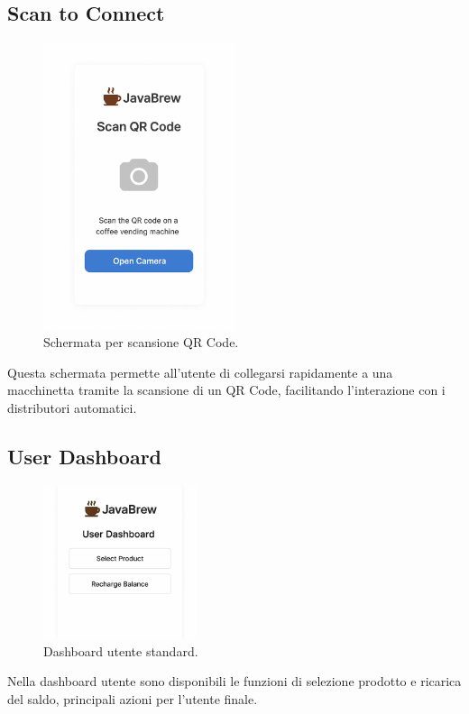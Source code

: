 \subsection{Scan to Connect}
\begin{figure}[H]
    \centering
    \includegraphics[width=0.5\textwidth]{./assets/scan_to_connect.png}
    \caption{Schermata per scansione QR Code.}
\end{figure}
Questa schermata permette all’utente di collegarsi rapidamente a una macchinetta tramite la scansione di un QR Code, facilitando l’interazione con i distributori automatici.

\subsection{User Dashboard}
\begin{figure}[H]
    \centering
    \includegraphics[width=0.4\textwidth]{./assets/User_dashboard.png}
    \caption{Dashboard utente standard.}
\end{figure}
Nella dashboard utente sono disponibili le funzioni di selezione prodotto e ricarica del saldo, principali azioni per l’utente finale.

